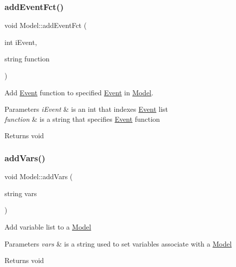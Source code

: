 \subsubsection{\texorpdfstring{add\+Event\+Fct()}{addEventFct()}}
{\footnotesize\ttfamily void Model\+::add\+Event\+Fct (\begin{DoxyParamCaption}\item[{int}]{i\+Event,  }\item[{string}]{function }\end{DoxyParamCaption})}



Add \hyperlink{class_event}{Event} function to specified \hyperlink{class_event}{Event} in \hyperlink{class_model}{Model}. 


\begin{DoxyParams}{Parameters}
{\em i\+Event} & is an int that indexes \hyperlink{class_event}{Event} list \\
\hline
{\em function} & is a string that specifies \hyperlink{class_event}{Event} function \\
\hline
\end{DoxyParams}
\begin{DoxyReturn}{Returns}
void 
\end{DoxyReturn}
\mbox{\label{class_model_a4743b4f267eeb1a60e21cc2995e1efcd}} 
\subsubsection{\texorpdfstring{add\+Vars()}{addVars()}}
{\footnotesize\ttfamily void Model\+::add\+Vars (\begin{DoxyParamCaption}\item[{string}]{vars }\end{DoxyParamCaption})}

Add variable list to a \hyperlink{class_model}{Model}


\begin{DoxyParams}{Parameters}
{\em vars} & is a string used to set variables associate with a \hyperlink{class_model}{Model} \\
\hline
\end{DoxyParams}
\begin{DoxyReturn}{Returns}
void 
\end{DoxyReturn}
\mbox{\label{class_model_aeba8f871483d714448a0bbf509ab21e7}} 
